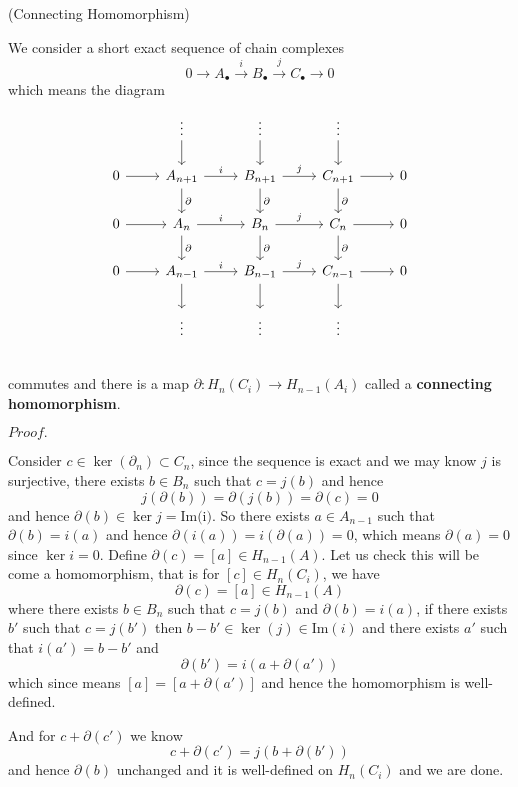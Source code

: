 \documentclass{article}
\newcommand{\Pf}[1]{$Proof.$\par}
\begin{document}
\begin{definition}(Connecting Homomorphism)\par
    We consider a short exact sequence of chain complexes
    \[0 \rightarrow A_{\bullet} \overset{i}{\rightarrow} B_{\bullet} \overset{j}{\rightarrow} C_{\bullet} \to 0\]
    which means the diagram
    \[
    \begin{tikzcd}
        & \vdots\arrow[d] & \vdots\arrow[d] & \vdots\arrow[d] & \\
        0\arrow[r] & A_{n+1}\arrow[r,"i"]\arrow[d,"\partial"] & B_{n+1}\arrow[r,"j"]\arrow[d,"\partial"] & C_{n+1}\arrow[r]\arrow[d,"\partial"] & 0 \\
        0\arrow[r] & A_{n}\arrow[r,"i"]\arrow[d,"\partial"] & B_{n}\arrow[r,"j"]\arrow[d,"\partial"] & C_{n}\arrow[r]\arrow[d,"\partial"] & 0 \\
        0\arrow[r] & A_{n-1}\arrow[r,"i"]\arrow[d] & B_{n-1}\arrow[r,"j"]\arrow[d] & C_{n-1}\arrow[r]\arrow[d] & 0 \\
        & \vdots & \vdots & \vdots & \\
    \end{tikzcd}
    \]
    commutes and there is a map $\partial:H_n(C_i) \to H_{n-1}(A_i)$ called a \textbf{connecting homomorphism}.
\end{definition}
\Pf\par
    Consider $c\in \ker(\partial_n) \subset C_n$, since the sequence is exact and we may know $j$ is surjective, there exists $b\in B_n$ such that $c = j(b)$ and hence
    \[j(\partial(b)) = \partial(j(b)) = \partial(c) = 0\]
    and hence $\partial(b) \in \ker j = \text{Im(i)}$. So there exists $a\in A_{n-1}$ such that $\partial(b) = i(a)$ and hence $\partial(i(a)) = i(\partial(a)) = 0$, which means $\partial(a) = 0$ since $\ker i = 0$. Define $\partial(c) = [a]\in H_{n-1}(A)$.
    Let us check this will be come a homomorphism, that is for $[c] \in H_n(C_i)$, we have
    \[
    \partial(c) = [a] \in H_{n-1}(A)
    \]
    where there exists $b\in B_n$ such that $c = j(b)$ and $\partial(b) = i(a)$, if there exists $b'$ such that $c = j(b')$ then $b-b'\in \ker(j) \in \text{Im}(i)$ and there exists $a'$ such that $i(a') = b-b'$ and
    \[
    \partial(b') = i(a+\partial(a'))
    \]
    which since means $[a] = [a+\partial(a')]$ and hence the homomorphism is well-defined.\par
    And for $c+\partial(c')$ we know
    \[
    c+\partial(c') = j(b+\partial(b'))
    \]
    and hence $\partial(b)$ unchanged and it is well-defined on $H_{n}(C_i)$ and we are done.
\end{document}
